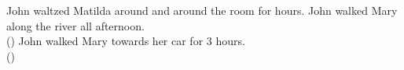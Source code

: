 \documentclass[output=paper,colorlinks,citecolor=brown]{langscibook}
\begin{document}
\ea \label{dancing} \ea John waltzed Matilda around and around the room for hours. %
\ex John walked Mary along the river all afternoon. \\\hfill (\citealt[125]{FolliAndHarley2006})
\ex John walked Mary towards her car for 3 hours.\\ \hfill (\citealt[137]{FolliAndHarley2006}) 
\z \z




\end{document}
